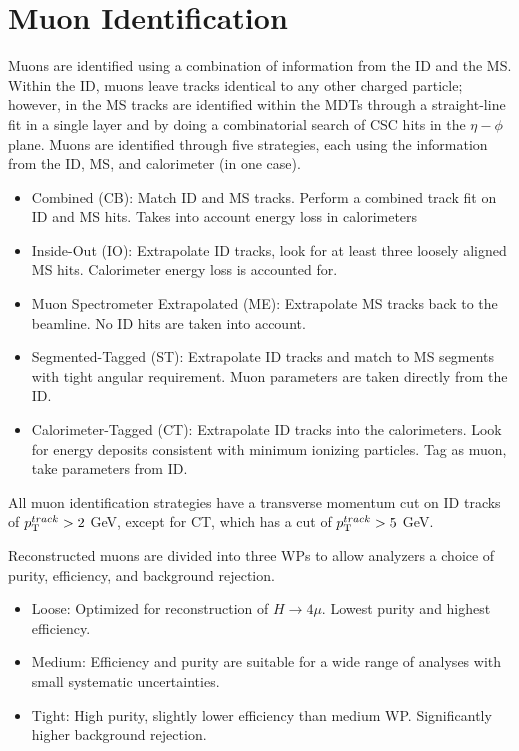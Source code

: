 	\section{Muon Identification}\label{sec:reco-muon}
	Muons are identified using a combination of information from the ID and the MS. Within the ID, muons leave tracks identical to any other charged particle; however, in the MS tracks are identified within the MDTs through a straight-line fit in a single layer and by doing a combinatorial search of CSC hits in the $\eta-\phi$ plane. \cite{muon-id} Muons are identified through five strategies, each using the information from the ID, MS, and calorimeter (in one case).
	\begin{itemize}
		\item Combined (CB): Match ID and MS tracks. Perform a combined track fit on ID and MS hits. Takes into account energy loss in calorimeters
		\item Inside-Out (IO): Extrapolate ID tracks, look for at least three loosely aligned MS hits. Calorimeter energy loss is accounted for.
		\item Muon Spectrometer Extrapolated (ME): Extrapolate MS tracks back to the beamline. No ID hits are taken into account.
		\item Segmented-Tagged (ST): Extrapolate ID tracks and match to MS segments with tight angular requirement. Muon parameters are taken directly from the ID.
		\item Calorimeter-Tagged (CT): Extrapolate ID tracks into the calorimeters. Look for energy deposits consistent with minimum ionizing particles. Tag as muon, take parameters from ID.
	\end{itemize}
	All muon identification strategies have a transverse momentum cut on ID tracks of $p_{\text{T}}^{track}> 2$ GeV, except for CT, which has a cut of $p_{\text{T}}^{track} > 5$ GeV.
	
	Reconstructed muons are divided into three WPs to allow analyzers a choice of purity, efficiency, and background rejection. 
	\begin{itemize}
		\item Loose: Optimized for reconstruction of $H\rightarrow4\mu$. Lowest purity and highest efficiency.
		\item Medium: Efficiency and purity are suitable for a wide range of analyses with small systematic uncertainties.
		\item Tight: High purity, slightly lower efficiency than medium WP. Significantly higher background rejection.
	\end{itemize}

